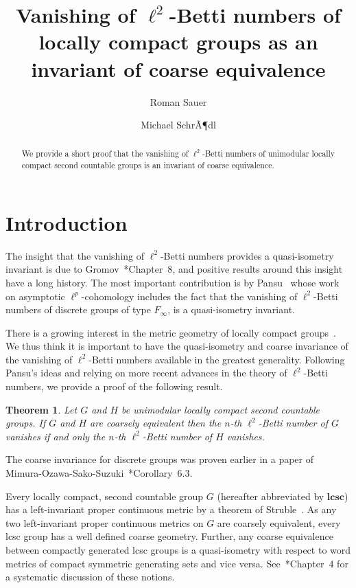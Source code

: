 \documentclass[10pt]{amsart}
\author{Roman Sauer}
\author{Michael SchrÃ¶dl}
\title[$\ell^2$-Betti numbers and coarse equivalence]{Vanishing of $\ell^2$-Betti numbers of locally compact groups as an invariant of coarse equivalence}
\theoremstyle{plain}
\newtheorem{thm}{Theorem}
\theoremstyle{definition}
\theoremstyle{remark}
\begin{document}
\begin{abstract}
We provide a short proof that the vanishing of $\ell^2$-Betti numbers of unimodular locally compact second countable groups is an invariant of coarse equivalence.
\end{abstract}

 \maketitle
 

\section{Introduction}

The insight that the vanishing of $\ell^2$-Betti numbers provides a quasi-isometry invariant is due to Gromov~\cite{gromov}*{Chapter~8}, and positive results around this insight have a long history. The most important contribution is by Pansu~\cite{pansu} whose work on asymptotic $\ell^p$-cohomology includes the fact that the 
vanishing of $\ell^2$-Betti numbers of discrete groups of type $F_\infty$, is 
a quasi-isometry invariant. 

There is a growing interest in the metric geometry of locally compact groups~\cites{cornulier-book, amhyp}. We thus think it is important to have the quasi-isometry and coarse invariance of the vanishing of $\ell^2$-Betti numbers available in the greatest generality. Following Pansu's ideas and relying on more recent advances in the theory of $\ell^2$-Betti numbers, we provide a proof of the following result. 

\begin{thm}\label{thm: main}
Let $G$ and $H$ be unimodular locally compact second countable groups. If $G$ and $H$ are coarsely equivalent then the $n$-th $\ell^2$-Betti number of $G$ vanishes if and only the $n$-th $\ell^2$-Betti number of $H$ vanishes.
\end{thm}

The coarse invariance for discrete groups was proven earlier 
in a paper of Mimura-Ozawa-Sako-Suzuki~\cite{taka}*{Corollary~6.3}. 

Every locally compact, second countable group $G$ (hereafter abbreviated by $\textbf{lcsc}$) has a left-invariant proper continuous metric by a theorem of Struble~\cite{struble}. As any two left-invariant proper continuous metrics on $G$ are coarsely equivalent, every lcsc group has a well defined coarse geometry.     
Further, any coarse equivalence between compactly generated lcsc groups is a quasi-isometry with respect to word metrics of compact symmetric generating sets and vice versa. See~\cite{cornulier-book}*{Chapter~4} for a systematic discussion of these notions. 
\end{document}
